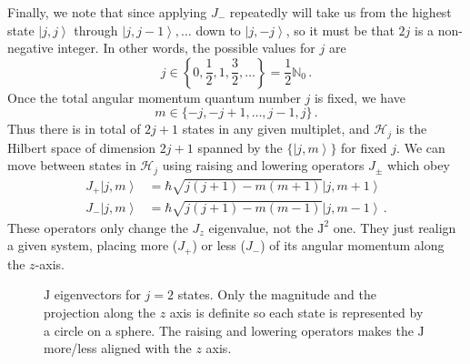 \documentclass{article}
\theoremstyle{plain}\theoremheaderfont{\normalfont\itshape}\theorembodyfont{\rmfamily}\theoremseparator{.}\newtheorem*{rem}{Remark}\newtheorem*{ex}{Example}\newtheorem*{proof}{Proof}\newtheorem*{altp}{Alternative proof}
\theoremstyle{plain}\theoremheaderfont{\normalfont\bfseries}\theorembodyfont{\rmfamily}\theoremseparator{.}\newtheorem{thm}{Theorem}[section]\newtheorem{lem}[thm]{Lemma}\newtheorem{prop}[thm]{Proposition}\newtheorem*{cor}{Corollary}\newtheorem{defn}[thm]{Definition}\newtheorem{clm}[thm]{Claim}\newtheorem{clminproof}{Claim}
\theoremstyle{break}\theoremheaderfont{\normalfont\itshape}\theorembodyfont{\rmfamily}\theoremseparator{.\medskip}\newtheorem*{proofskip}{Proof}\newtheorem*{exs}{Examples}\newtheorem*{rems}{Remarks}
\theoremstyle{break}\theoremheaderfont{\normalfont\bfseries}\theorembodyfont{\rmfamily}\theoremseparator{.\medskip}\newtheorem{lemskip}[thm]{Lemma}\newtheorem{defnskip}[thm]{Definition}\newtheorem{propskip}[thm]{Proposition}\newtheorem{thmskip}[thm]{Theorem}
\numberwithin{equation}{section}
\newcommand{\ket}[1]{\left| #1 \right\rangle}
\newcommand{\vb}[1]{\bm{\mathrm{#1}}}
\newcommand{\hb}{\mathcal{H}}
\newcommand{\NN}{\mathbb{N}}
\begin{document}
    Finally, we note that since applying \(J_-\) repeatedly will take us from the highest state \(\ket{j,j}\) through \(\ket{j,j-1},\dots\) down to \(\ket{j,-j}\), so it must be that \(2j\) is a non-negative integer. In other words, the possible values for \(j\) are
    \begin{equation}
        j\in\left\{0,\frac{1}{2},1,\frac{3}{2},\dots\right\}=\frac{1}{2}\NN_0\,.
    \end{equation}
    Once the total angular momentum quantum number \(j\) is fixed, we have
    \begin{equation}
        m\in\{-j,-j+1,\dots,j-1,j\}\,.
    \end{equation}
    Thus there is in total of \(2j+1\) states in any given multiplet, and \(\hb_j\) is the Hilbert space of dimension \(2j+1\) spanned by the \(\{\ket{j,m}\}\) for fixed \(j\). We can move between states in \(\hb_j\) using raising and lowering operators \(J_\pm\) which obey
    \begin{align}
        J_+\ket{j,m}&=\hbar\sqrt{j(j+1)-m(m+1)}\ket{j,m+1}\label{ang_momentum_raising}\\
        J_-\ket{j,m}&=\hbar\sqrt{j(j+1)-m(m-1)}\ket{j,m-1}\label{ang_momentum_lowering}\,.
    \end{align}
    These operators only change the \(J_z\) eigenvalue, not the \(\vb{J}^2\) one. They just realign a given system, placing more (\(J_+\)) or less (\(J_-\)) of its angular momentum along the \(z\)-axis.

    \begin{figure}
        \centering
        \caption{\(\vb{J}\) eigenvectors for \(j=2\) states. Only the magnitude and the projection along the \(z\) axis is definite so each state is represented by a circle on a sphere. The raising and lowering operators makes the \(\vb{J}\) more/less aligned with the \(z\) axis.}
    \end{figure}
\end{document}
